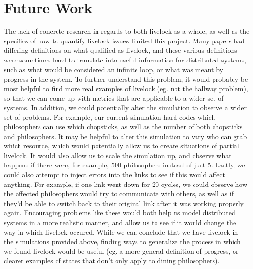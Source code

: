 \documentclass{article}
\begin{document}
\section{Future Work} %
The lack of concrete research in regards to both livelock as a whole, as well as the specifics of how to quantify livelock issues limited this project.  Many papers had differing definitions on what qualified as livelock, and these various definitions were sometimes hard to translate into useful information for distributed systems, such as what would be considered an infinite loop, or what was meant by progress in the system.  To further understand this problem, it would probably be most helpful to find more real examples of livelock (eg. not the hallway problem), so that we can come up with metrics that are applicable to a wider set of systems.  In addition, we could potentially alter the simulation to observe a wider set of problems.  For example, our current simulation hard-codes which philosophers can use which chopsticks, as well as the number of both chopsticks and philosophers.  It may be helpful to alter this simulation to vary who can grab which resource, which would potentially allow us to create situations of partial livelock.  It would also allow us to scale the simulation up, and observe what happens if there were, for example, 500 philosophers instead of just 5.  Lastly, we could also attempt to inject errors into the links to see if this would affect anything.  For example, if one link went down for 20 cycles, we could observe how the affected philosophers would try to communicate with others, as well as if they'd be able to switch back to their original link after it was working properly again.  Encouraging problems like these would both help us model distributed systems in a more realistic manner, and allow us to see if it would change the way in which livelock occured.  While we can conclude that we have livelock in the simulations provided above, finding ways to generalize the process in which we found livelock would be useful  (eg. a more general definition of progress, or clearer examples of states that don't only apply to dining philosophers). 
\end{document}
